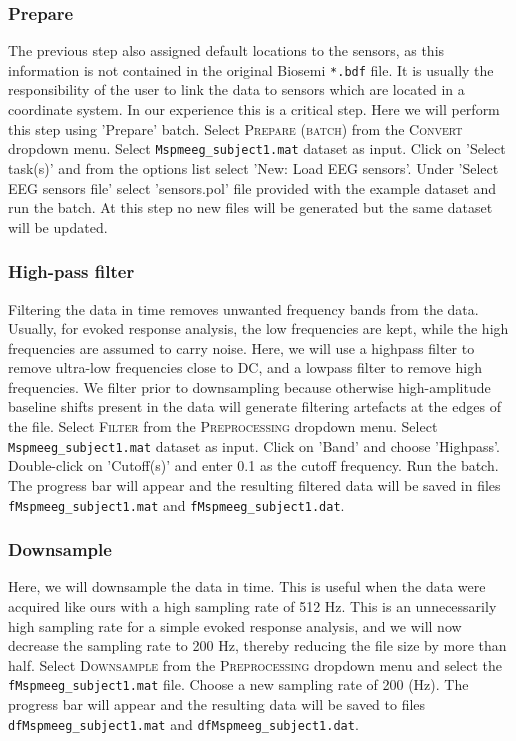 \subsubsection{Prepare}
The previous step also assigned default locations to the sensors, as this information is not contained in the original Biosemi \texttt{*.bdf} file. It is usually the responsibility of the user to link the data to sensors which are located in a coordinate system. In our experience this is a critical step. Here we will perform this step using 'Prepare' batch. Select \textsc{Prepare (batch)} from the \textsc{Convert} dropdown menu. Select \texttt{Mspmeeg\_subject1.mat} dataset as input. Click on 'Select task(s)' and from the options list select 'New: Load EEG sensors'. Under 'Select EEG sensors file' select 'sensors.pol' file provided with the example dataset and run the batch. At this step no new files will be generated but the same dataset will be updated.

\subsubsection{High-pass filter}
Filtering the data in time removes unwanted frequency bands from the data. Usually, for evoked response analysis, the low frequencies are kept, while the high frequencies are assumed to carry noise. Here, we will use a highpass filter to remove ultra-low frequencies close to DC, and a lowpass filter to remove high frequencies. We filter prior to downsampling because otherwise high-amplitude baseline shifts present in the data will generate filtering artefacts at the edges of the file. Select \textsc{Filter} from the \textsc{Preprocessing} dropdown menu. Select \texttt{Mspmeeg\_subject1.mat} dataset as input.  Click on 'Band' and choose 'Highpass'. Double-click on 'Cutoff(s)' and enter 0.1 as the cutoff frequency. Run the batch. The progress bar will appear and the resulting filtered data will be saved in files \texttt{fMspmeeg\_subject1.mat} and \texttt{fMspmeeg\_subject1.dat}.

\subsubsection{Downsample}
Here, we will downsample the data in time. This is useful when the data were acquired like ours with a high sampling rate of 512 Hz. This is an unnecessarily high sampling rate for a simple evoked response analysis, and we will now decrease the sampling rate to 200 Hz, thereby reducing the file size by more than half.  Select \textsc{Downsample} from the  \textsc{Preprocessing} dropdown menu and select the \texttt{fMspmeeg\_subject1.mat} file. Choose a new sampling rate of 200 (Hz). The progress bar will appear and the resulting data will be saved to files \texttt{dfMspmeeg\_subject1.mat} and \texttt{dfMspmeeg\_subject1.dat}.


